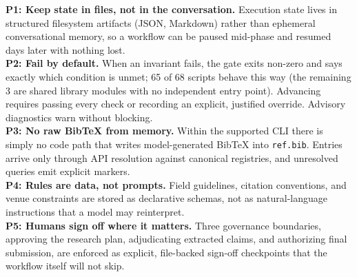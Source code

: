 \documentclass[conference]{IEEEtran}
\begin{document}
\noindent\textbf{P1: Keep state in files, not in the conversation.} Execution state lives in structured filesystem artifacts (JSON, Markdown) rather than ephemeral conversational memory, so a workflow can be paused mid-phase and resumed days later with nothing lost.\\
\noindent\textbf{P2: Fail by default.} When an invariant fails, the gate exits non-zero and says exactly which condition is unmet; 65 of 68 scripts behave this way (the remaining 3 are shared library modules with no independent entry point). Advancing requires passing every check or recording an explicit, justified override. Advisory diagnostics warn without blocking.\\
\noindent\textbf{P3: No raw BibTeX from memory.} Within the supported CLI there is simply no code path that writes model-generated BibTeX into \texttt{ref.bib}. Entries arrive only through API resolution against canonical registries, and unresolved queries emit explicit markers.\\
\noindent\textbf{P4: Rules are data, not prompts.} Field guidelines, citation conventions, and venue constraints are stored as declarative schemas, not as natural-language instructions that a model may reinterpret.\\
\noindent\textbf{P5: Humans sign off where it matters.} Three governance boundaries, approving the research plan, adjudicating extracted claims, and authorizing final submission, are enforced as explicit, file-backed sign-off checkpoints that the workflow itself will not skip.
\end{document}
